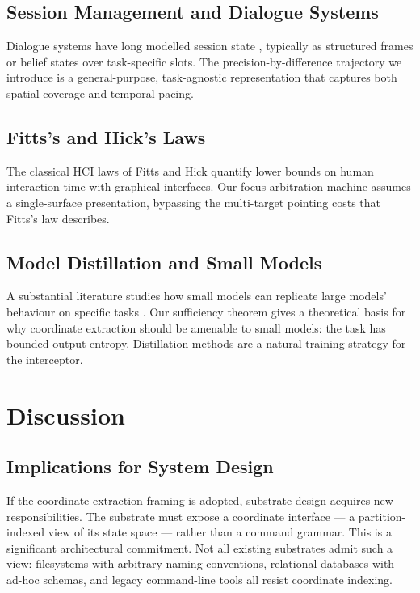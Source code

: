 \documentclass[11pt,twocolumn,a4paper]{article}
\theoremstyle{definition}
\theoremstyle{remark}
\begin{document}
\subsection{Session Management and Dialogue Systems}

Dialogue systems have long modelled session state \citep{young2013pomdp, henderson2014dst}, typically as structured frames or belief states over task-specific slots. The precision-by-difference trajectory we introduce is a general-purpose, task-agnostic representation that captures both spatial coverage and temporal pacing.

\subsection{Fitts's and Hick's Laws}

The classical HCI laws of Fitts \citep{fitts1954information} and Hick \citep{hick1952rate} quantify lower bounds on human interaction time with graphical interfaces. Our focus-arbitration machine assumes a single-surface presentation, bypassing the multi-target pointing costs that Fitts's law describes.

\subsection{Model Distillation and Small Models}

A substantial literature studies how small models can replicate large models' behaviour on specific tasks \citep{hinton2015distilling, sanh2019distilbert, jiao2020tinybert}. Our sufficiency theorem gives a theoretical basis for why coordinate extraction should be amenable to small models: the task has bounded output entropy. Distillation methods are a natural training strategy for the interceptor.

\section{Discussion}
\label{sec:discussion}

\subsection{Implications for System Design}

If the coordinate-extraction framing is adopted, substrate design acquires new responsibilities. The substrate must expose a coordinate interface --- a partition-indexed view of its state space --- rather than a command grammar. This is a significant architectural commitment. Not all existing substrates admit such a view: filesystems with arbitrary naming conventions, relational databases with ad-hoc schemas, and legacy command-line tools all resist coordinate indexing.
\end{document}
